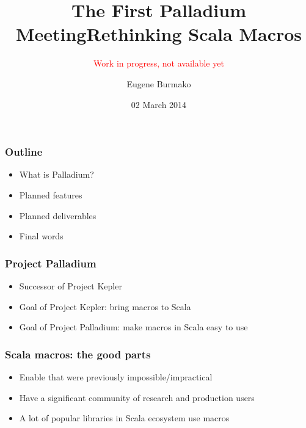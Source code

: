\documentclass[svgnames,dvipsnames,hyperref={bookmarks=false}]{beamer}
\title{The First Palladium Meeting}
\begin{document}
\title{Rethinking Scala Macros}
\subtitle{\textcolor{red}{Work in progress, not available yet}}
\author{Eugene Burmako}
\date{02 March 2014}
{
\begin{frame}
  \titlepage
\end{frame}
}

\begin{frame}[fragile]
\frametitle{Outline}

\begin{itemize}
\item What is Palladium?
\item Planned features
\item Planned deliverables
\item Final words
\end{itemize}
\end{frame}

\begin{frame}[fragile]
\frametitle{}

\vskip40pt
\begin{center}
\end{center}
\end{frame}

\begin{frame}[fragile]
\frametitle{Project Palladium}

\begin{itemize}
\item Successor of Project Kepler
\item Goal of Project Kepler: bring macros to Scala
\item Goal of Project Palladium: make macros in Scala easy to use
\end{itemize}
\end{frame}

\begin{frame}[fragile]
\frametitle{Scala macros: the good parts}

\begin{itemize}
\item Enable  that were previously impossible/impractical
\item Have a significant community of research and production users
\item A lot of popular libraries in Scala ecosystem use macros
\end{itemize}
\end{frame}
\end{document}
